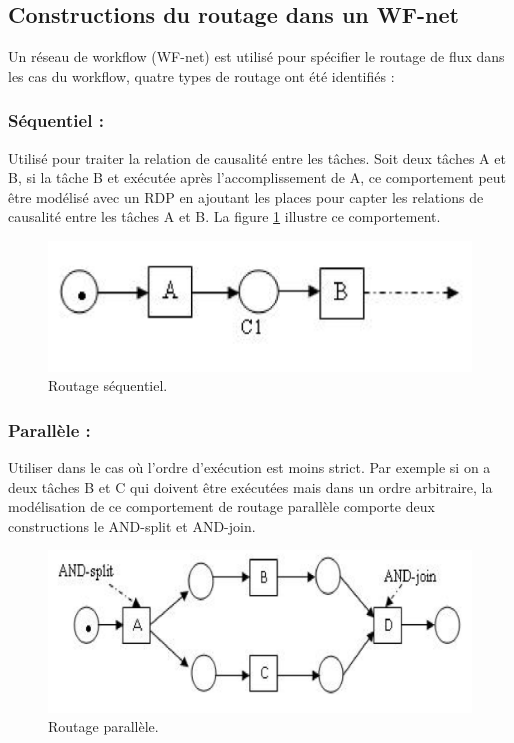 \subsection{Constructions du routage dans un WF-net}
Un réseau de workflow (WF-net) est utilisé pour spécifier le routage de flux dans les cas du workflow, quatre types de routage ont été identifiés :

\subsubsection{Séquentiel :}

Utilisé pour traiter la relation de causalité entre les tâches. Soit deux tâches A et B, si la tâche B et exécutée après l’accomplissement de A, ce comportement peut être modélisé avec un RDP en ajoutant les places pour capter les relations de causalité entre les tâches A et B. La figure \ref{fig:wf003} illustre ce comportement.


\begin{figure}[H]
	\centering
	\includegraphics[width=0.7\linewidth]{images/wf003}
	\caption{Routage séquentiel.}
	\label{fig:wf003}
\end{figure}

\subsubsection{Parallèle : }
Utiliser dans le cas où l’ordre d’exécution est moins strict. Par exemple si on a deux tâches B et C qui doivent être exécutées mais dans un ordre arbitraire, la modélisation de ce comportement de routage parallèle comporte deux constructions le AND-split et AND-join.


\begin{figure}[H]
	\centering
	\includegraphics[width=0.7\linewidth]{images/Capture}
	\caption{Routage parallèle.}
	\label{fig:capture}
\end{figure}

